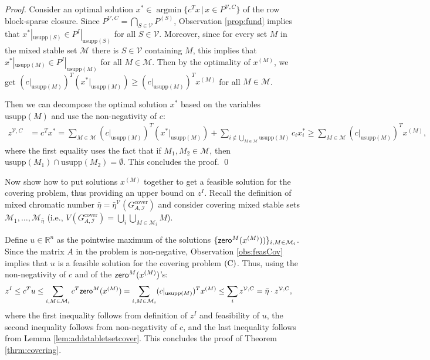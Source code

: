 \documentclass[smallextended]{svjour3}
\begin{document}
\begin{proof}
Consider an optimal solution $x^* \in \operatorname{argmin}\{c^Tx \,|\, x \in P^{\mathcal{V}, C}\}$ of the row block-sparse closure. Since 
$P^{\mathcal{V}, C} = \bigcap_{S \in \mathcal{V}} P^{(S)}$, Observation \ref{prop:fund} implies that $x^*|_{{\textrm{usupp}}(S)} \in P^I|_{{\textrm{usupp}}(S)}$ for all $S \in {\mathcal{V}}$. Moreover, since for every set $M$ in the mixed stable set ${\mathcal{M}}$ there is $S \in {\mathcal{V}}$ containing $M$, this implies that $x^*|_{{\textrm{usupp}}(M)} \in P^I|_{{\textrm{usupp}}(M)}$ for all $M \in {\mathcal{M}}$. Then by the optimality of $x^{(M)}$, we get $(c|_{{\textrm{usupp}}(M)})^T (x^*|_{{\textrm{usupp}}(M)}) \ge (c|_{{\textrm{usupp}}(M)})^T x^{(M)}$ for all $M \in {\mathcal{M}}$.

	Then we can decompose the optimal solution $x^*$ based on the variables ${\textrm{usupp}}(M)$ and use the non-negativity of $c$:
		\begin{align*}
		z^{\mathcal{V}, C} &= c^T x^* = \sum_{M\in \mathcal{M}} (c|_{{\textrm{usupp}}(M)})^T (x^*|_{{\textrm{usupp}}(M)}) + \sum_{i \notin \bigcup_{M \in {\mathcal{M}}} {\textrm{usupp}}(M)} c_i x^*_i \ge \sum_{M\in \mathcal{M}} (c|_{{\textrm{usupp}}(M)})^T x^{(M)},	
	\end{align*}
	where the first equality uses the fact that if $M_1, M_2 \in \mathcal{M}$, then ${\textrm{usupp}}(M_1)\cap {\textrm{usupp}}(M_2) = \emptyset$. This concludes the proof. {
\ifmp
	\hfill \qed
\fi
}
\end{proof}

	Now show how to put solutions $x^{(M)}$ together to get a feasible solution for the covering problem, thus providing an upper bound on $z^I$. Recall the definition of mixed chromatic number $\bar{\eta} = \bar{\eta}^{\mathcal{V}}({G^{\textrm{cover}}_{A, {\mathcal{I}}}})$ and consider covering mixed stable sets ${\mathcal{M}}_1, \ldots, {\mathcal{M}}_{\bar{\eta}}$ (i.e., $V({G^{\textrm{cover}}_{A, {\mathcal{I}}}}) = \bigcup_i \bigcup_{M \in {\mathcal{M}}_i} M$).
 
	Define $u \in {\mathbb{R}}^n$ as the pointwise maximum of the solutions $\{{{\sf zero}}^M(x^{(M)}))\}_{i, M \in {\mathcal{M}}_i}$. Since the matrix $A$ in the problem is non-negative, Observation \ref{obs:feasCov} implies that $u$ is a feasible solution for the covering problem $(\textup{C})$. Thus, using the non-negativity of $c$ and of the ${{\sf zero}}^M(x^{(M)})$'s:
		\begin{align*}
		z^I &\leq c^T u \le \sum_{i, M \in {\mathcal{M}}_i} c^T {{\sf zero}}^M(x^{(M)}) = \sum_{i, M \in {\mathcal{M}}_i} (c|_{{\textrm{usupp}}(M)})^T x^{(M)} \le \sum_i z^{{\mathcal{V}},C} = \bar{\eta} \cdot z^{{\mathcal{V}},C},
	\end{align*}
where the first inequality follows from definition of $z^I$ and feasibility of $u$, the second inequality follows from non-negativity of $c$, 	and the last inequality follows from Lemma \ref{lem:addstabletsetcover}. This concludes the proof of Theorem \ref{thrm:covering}. 	
	
\end{document}
